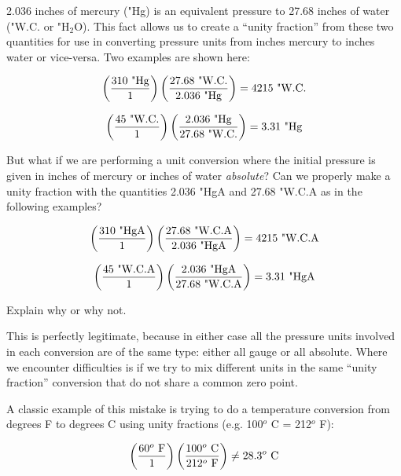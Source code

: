 

2.036 inches of mercury ("Hg) is an equivalent pressure to 27.68 inches of water ("W.C. or "H$_{2}$O).  This fact allows us to create a ``unity fraction'' from these two quantities for use in converting pressure units from inches mercury to inches water or vice-versa.  Two examples are shown here:

$$\left({{310 \hbox{ "Hg}} \over {1}}\right) \left({{27.68 \hbox{ "W.C.}} \over {2.036 \hbox{ "Hg}}}\right) = 4215 \hbox{ "W.C.}$$

$$\left({{45 \hbox{ "W.C.}} \over {1}}\right) \left({2.036 \hbox{ "Hg}} \over {{27.68 \hbox{ "W.C.}}}\right) = 3.31 \hbox{ "Hg}$$

But what if we are performing a unit conversion where the initial pressure is given in inches of mercury or inches of water {\it absolute}?  Can we properly make a unity fraction with the quantities 2.036 "HgA and 27.68 "W.C.A as in the following examples?  

$$\left({{310 \hbox{ "HgA}} \over {1}}\right) \left({{27.68 \hbox{ "W.C.A}} \over {2.036 \hbox{ "HgA}}}\right) = 4215 \hbox{ "W.C.A}$$

$$\left({{45 \hbox{ "W.C.A}} \over {1}}\right) \left({2.036 \hbox{ "HgA}} \over {{27.68 \hbox{ "W.C.A}}}\right) = 3.31 \hbox{ "HgA}$$

Explain why or why not.







This is perfectly legitimate, because in either case all the pressure units involved in each conversion are of the same type: either all gauge or all absolute.  Where we encounter difficulties is if we try to mix different units in the same ``unity fraction'' conversion that do not share a common zero point.  

A classic example of this mistake is trying to do a temperature conversion from degrees F to degrees C using unity fractions (e.g. 100$^{o}$ C = 212$^{o}$ F):

$$\left({{60^o \hbox{ F}} \over {1}}\right)  \left({{100^o \hbox{ C}} \over {212^o \hbox{ F}}}\right) \neq 28.3^o \hbox{ C}$$

